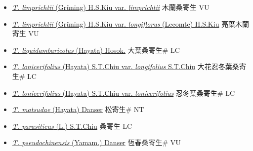 \begin{itemize}
  \begin{itemize}
        \item[] \href{http://www.theplantlist.org/tpl1.1/search?q=Taxillus+limprichtii+var.+limprichtii}{\textit{T. limprichtii} (Grüning) H.S.Kiu var. \textit{limprichtii}}   木蘭桑寄生 VU
        \item[] \href{http://www.theplantlist.org/tpl1.1/search?q=Taxillus+limprichtii+var.+longiflorus}{\textit{T. limprichtii} (Grüning) H.S.Kiu var. \textit{longiflorus} (Lecomte) H.S.Kiu}   亮葉木蘭寄生 VU
        \item[] \href{http://www.theplantlist.org/tpl1.1/search?q=Taxillus+liquidambaricolus}{\textit{T. liquidambaricolus} (Hayata) Hosok.}   大葉桑寄生\# LC
        \item[] \href{http://www.theplantlist.org/tpl1.1/search?q=Taxillus+lonicerifolius+var.+longifolius}{\textit{T. lonicerifolius} (Hayata) S.T.Chiu var. \textit{longifolius} S.T.Chiu}   大花忍冬葉桑寄生\# LC
        \item[] \href{http://www.theplantlist.org/tpl1.1/search?q=Taxillus+lonicerifolius+var.+lonicerifolius}{\textit{T. lonicerifolius} (Hayata) S.T.Chiu var. \textit{lonicerifolius}}   忍冬葉桑寄生\# LC
        \item[] \href{http://www.theplantlist.org/tpl1.1/search?q=Taxillus+matsudae}{\textit{T. matsudae} (Hayata) Danser}   松寄生\# NT
        \item[] \href{http://www.theplantlist.org/tpl1.1/search?q=Taxillus+parasiticus}{\textit{T. parasiticus} (L.) S.T.Chiu}   桑寄生 LC
        \item[] \href{http://www.theplantlist.org/tpl1.1/search?q=Taxillus+pseudochinensis}{\textit{T. pseudochinensis} (Yamam.) Danser}   恆春桑寄生\# VU

\end{itemize}
\end{itemize}
